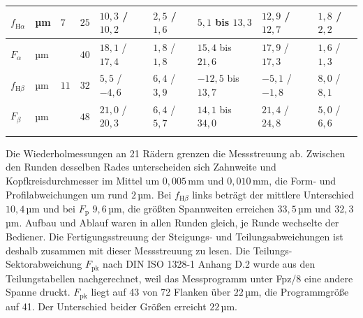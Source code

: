 \begin{table}[htbp]
\begin{tabular}{lllllllll}
		\hline
		$f_{\mathrm{H}\alpha}$ & µm      & $7$      & $25$ & $10{,}3$ / $10{,}2$                     & $2{,}5$ / $1{,}6$                                & $5{,}1$ bis $13{,}3$      & $12{,}9$ / $12{,}7$ & $1{,}8$ / $2{,}2$   \\
		\hline
		$F_{\alpha}$           & µm      &          & $40$ & $18{,}1$ / $17{,}4$                     & $1{,}8$ / $1{,}8$                                & $15{,}4$ bis $21{,}6$     & $17{,}9$ / $17{,}3$ & $1{,}6$ / $1{,}3$   \\
		\hline
		$f_{\mathrm{H}\beta}$  & µm      & $11$     & $32$ & $5{,}5$ / $-4{,}6$                      & $6{,}4$ / $3{,}9$                                & $-12{,}5$ bis $13{,}7$    & $-5{,}1$ / $-1{,}8$ & $8{,}0$ / $8{,}1$   \\
		\hline
		$F_{\beta}$            & µm      &          & $48$ & $21{,}0$ / $20{,}3$                     & $6{,}4$ / $5{,}7$                                & $14{,}1$ bis $34{,}0$     & $21{,}4$ / $24{,}8$ & $5{,}0$ / $6{,}6$   \\
		\hline
		\arrayrulecolor{black}
	\end{tabular}
\end{table}

Die Wiederholmessungen an 21 Rädern grenzen die Messstreuung ab. Zwischen den Runden desselben Rades unterscheiden sich Zahnweite und Kopfkreisdurchmesser im Mittel um $0{,}005$\,mm und $0{,}010$\,mm, die Form- und Profilabweichungen um rund $2$\,µm. Bei $f_{\mathrm{H}\beta}$ links beträgt der mittlere Unterschied $10{,}4$\,µm und bei $F_{\mathrm{p}}$ $9{,}6$\,µm, die größten Spannweiten erreichen $33{,}5$\,µm und $32{,}3$\,µm. Aufbau und Ablauf waren in allen Runden gleich, je Runde wechselte der Bediener. Die Fertigungsstreuung der Steigungs- und Teilungsabweichungen ist deshalb zusammen mit dieser Messstreuung zu lesen. Die Teilungs-Sektorabweichung $F_{\mathrm{pk}}$ nach DIN ISO 1328-1 Anhang D.2 wurde aus den Teilungstabellen nachgerechnet, weil das Messprogramm unter Fpz/8 eine andere Spanne druckt. $F_{\mathrm{pk}}$ liegt auf 43 von 72 Flanken über $22$\,µm, die Programmgröße auf 41. Der Unterschied beider Größen erreicht $22$\,µm.

